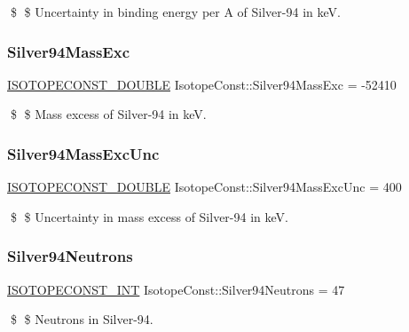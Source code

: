 \$ \$ Uncertainty in binding energy per A of Silver-\/94 in keV. \mbox{\label{group___isotope_const-_silver-_ag94_ga541c390b5d6cd155cdc27a1ed2f0023c}} 
\subsubsection{\texorpdfstring{Silver94\+Mass\+Exc}{Silver94MassExc}}
{\footnotesize\ttfamily \mbox{\hyperlink{group___isotope_const-_macros_ga8f45a7272ce02c0b4c65c44636ed719a}{I\+S\+O\+T\+O\+P\+E\+C\+O\+N\+S\+T\+\_\+\+D\+O\+U\+B\+LE}} Isotope\+Const\+::\+Silver94\+Mass\+Exc = -\/52410}

\$ \$ Mass excess of Silver-\/94 in keV. \mbox{\label{group___isotope_const-_silver-_ag94_ga42163c6d44d21cd3c32841ca6b0ead69}} 
\subsubsection{\texorpdfstring{Silver94\+Mass\+Exc\+Unc}{Silver94MassExcUnc}}
{\footnotesize\ttfamily \mbox{\hyperlink{group___isotope_const-_macros_ga8f45a7272ce02c0b4c65c44636ed719a}{I\+S\+O\+T\+O\+P\+E\+C\+O\+N\+S\+T\+\_\+\+D\+O\+U\+B\+LE}} Isotope\+Const\+::\+Silver94\+Mass\+Exc\+Unc = 400}

\$ \$ Uncertainty in mass excess of Silver-\/94 in keV. \mbox{\label{group___isotope_const-_silver-_ag94_ga29eb9df687bd15846e3e4d6a93f4b4ac}} 
\subsubsection{\texorpdfstring{Silver94\+Neutrons}{Silver94Neutrons}}
{\footnotesize\ttfamily \mbox{\hyperlink{group___isotope_const-_macros_ga5f18360b3e99483a35c32d789e62621c}{I\+S\+O\+T\+O\+P\+E\+C\+O\+N\+S\+T\+\_\+\+I\+NT}} Isotope\+Const\+::\+Silver94\+Neutrons = 47}

\$ \$ Neutrons in Silver-\/94. \mbox{\label{group___isotope_const-_silver-_ag94_ga8e11af340acfd3ec7cf288e97f51a95a}} 
